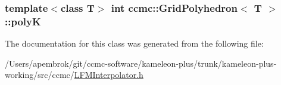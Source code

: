 \hypertarget{classccmc_1_1_grid_polyhedron_a2d84c3c8aa5821be3888d1bb636d2224}{
\subsubsection[{poly\-K}]{\setlength{\rightskip}{0pt plus 5cm}template$<$class T$>$ int {\bf ccmc\-::\-Grid\-Polyhedron}$<$ T $>$\-::poly\-K}}\label{classccmc_1_1_grid_polyhedron_a2d84c3c8aa5821be3888d1bb636d2224}


The documentation for this class was generated from the following file\-:\begin{DoxyCompactItemize}
\item 
/\-Users/apembrok/git/ccmc-\/software/kameleon-\/plus/trunk/kameleon-\/plus-\/working/src/ccmc/\hyperlink{_l_f_m_interpolator_8h}{L\-F\-M\-Interpolator.\-h}\end{DoxyCompactItemize}
